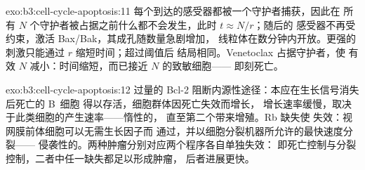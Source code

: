 \begin{solution}{exo:b3:cell-cycle-apoptosis:11}
每个到达的感受器都被一个守护者捕获，因此在
所有 $N$ 个守护者被占据之前什么都不会发生，此时 $t \approx N/r$；随后的
感受器不再受约束，激活 Bax/Bak，其成孔随数量急剧增加，
线粒体在数分钟内开放。更强的
刺激只能通过 $r$ 缩短时间；超过阈值后
结局相同。Venetoclax 占据守护者，使
有效 $N$ 减小：时间缩短，而已接近 $N$ 的致敏细胞——
即刻死亡。
\end{solution}

\begin{solution}{exo:b3:cell-cycle-apoptosis:12}
过量的 Bcl-2 阻断内源性途径：本应在生长信号消失后死亡的 B~细胞
得以存活，细胞群体因死亡失效而增长，
增长速率缓慢，取决于此类细胞的产生速率——惰性的，
直至第二个带来增殖。Rb 缺失使
失效：视网膜前体细胞可以无需生长因子而
通过，并以细胞分裂机器所允许的最快速度分裂——
侵袭性的。两种肿瘤分别对应两个程序各自单独失效：
即死亡控制与分裂控制，二者中任一缺失都足以形成肿瘤，
后者进展更快。
\end{solution}

